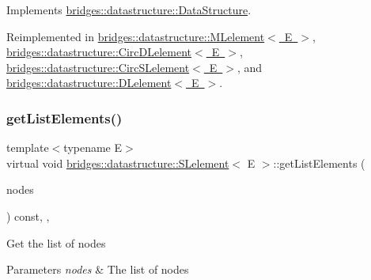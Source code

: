 Implements \mbox{\hyperlink{classbridges_1_1datastructure_1_1_data_structure_a4ff66cb34409f11fe9fc647f6d8a22ce}{bridges\+::datastructure\+::\+Data\+Structure}}.



Reimplemented in \mbox{\hyperlink{classbridges_1_1datastructure_1_1_m_lelement_a735c3cb43648b4d4e7d3316cdc1a1952}{bridges\+::datastructure\+::\+M\+Lelement$<$ E $>$}}, \mbox{\hyperlink{classbridges_1_1datastructure_1_1_circ_d_lelement_aec7f9b9dc6626c1a872feb91cd65425d}{bridges\+::datastructure\+::\+Circ\+D\+Lelement$<$ E $>$}}, \mbox{\hyperlink{classbridges_1_1datastructure_1_1_circ_s_lelement_a775ba08a7811fe91c396cb27ba9343ab}{bridges\+::datastructure\+::\+Circ\+S\+Lelement$<$ E $>$}}, and \mbox{\hyperlink{classbridges_1_1datastructure_1_1_d_lelement_a736ba8e6901608fb0ab04d781d2cceee}{bridges\+::datastructure\+::\+D\+Lelement$<$ E $>$}}.

\mbox{\label{classbridges_1_1datastructure_1_1_s_lelement_a81b68786cb93fe0f7edb48af789535a5}} 
\subsubsection{\texorpdfstring{get\+List\+Elements()}{getListElements()}}
{\footnotesize\ttfamily template$<$typename E$>$ \\
virtual void \mbox{\hyperlink{classbridges_1_1datastructure_1_1_s_lelement}{bridges\+::datastructure\+::\+S\+Lelement}}$<$ E $>$\+::get\+List\+Elements (\begin{DoxyParamCaption}\item[{vector$<$ const \mbox{\hyperlink{classbridges_1_1datastructure_1_1_s_lelement}{S\+Lelement}}$<$ E $>$ $\ast$$>$ \&}]{nodes }\end{DoxyParamCaption}) const\hspace{0.3cm}{\ttfamily [inline]}, {\ttfamily [protected]}, {\ttfamily [virtual]}}

Get the list of nodes


\begin{DoxyParams}{Parameters}
{\em nodes} & The list of nodes \\
\hline
\end{DoxyParams}
\mbox{\label{classbridges_1_1datastructure_1_1_s_lelement_ae43dd771d9ced7cb17f1d35f34cd9a42}} 
